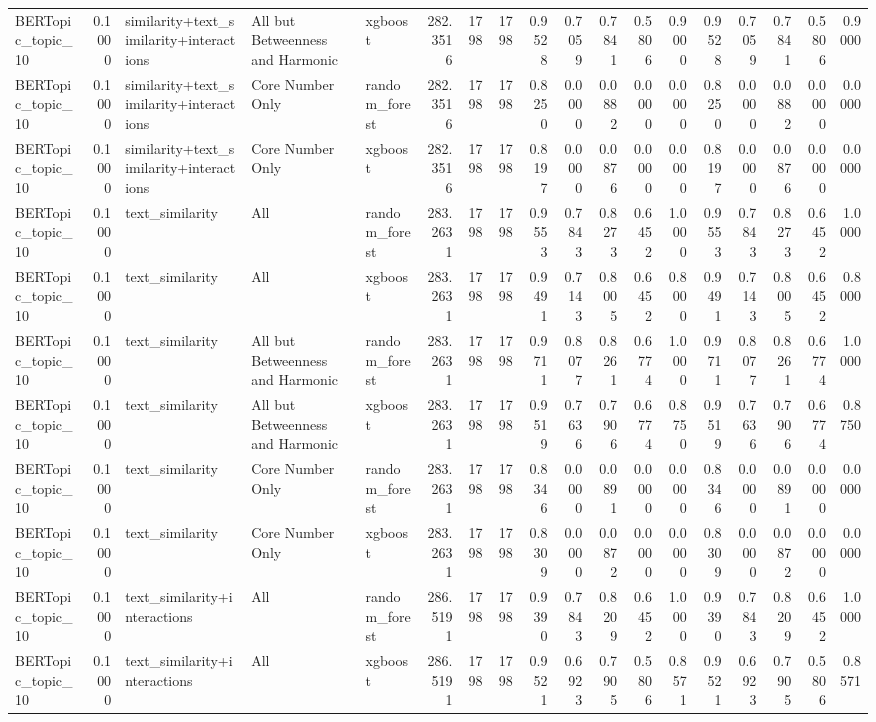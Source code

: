 \begin{tabular}{lrlllrrrrrrrrrrrrr}
BERTopic_topic_10 & 0.1000 & similarity+text_similarity+interactions & All but Betweenness and Harmonic & xgboost & 282.3516 & 1798 & 1798 & 0.9528 & 0.7059 & 0.7841 & 0.5806 & 0.9000 & 0.9528 & 0.7059 & 0.7841 & 0.5806 & 0.9000 \\
BERTopic_topic_10 & 0.1000 & similarity+text_similarity+interactions & Core Number Only & random_forest & 282.3516 & 1798 & 1798 & 0.8250 & 0.0000 & 0.0882 & 0.0000 & 0.0000 & 0.8250 & 0.0000 & 0.0882 & 0.0000 & 0.0000 \\
BERTopic_topic_10 & 0.1000 & similarity+text_similarity+interactions & Core Number Only & xgboost & 282.3516 & 1798 & 1798 & 0.8197 & 0.0000 & 0.0876 & 0.0000 & 0.0000 & 0.8197 & 0.0000 & 0.0876 & 0.0000 & 0.0000 \\
BERTopic_topic_10 & 0.1000 & text_similarity & All & random_forest & 283.2631 & 1798 & 1798 & 0.9553 & 0.7843 & 0.8273 & 0.6452 & 1.0000 & 0.9553 & 0.7843 & 0.8273 & 0.6452 & 1.0000 \\
BERTopic_topic_10 & 0.1000 & text_similarity & All & xgboost & 283.2631 & 1798 & 1798 & 0.9491 & 0.7143 & 0.8005 & 0.6452 & 0.8000 & 0.9491 & 0.7143 & 0.8005 & 0.6452 & 0.8000 \\
BERTopic_topic_10 & 0.1000 & text_similarity & All but Betweenness and Harmonic & random_forest & 283.2631 & 1798 & 1798 & 0.9711 & 0.8077 & 0.8261 & 0.6774 & 1.0000 & 0.9711 & 0.8077 & 0.8261 & 0.6774 & 1.0000 \\
BERTopic_topic_10 & 0.1000 & text_similarity & All but Betweenness and Harmonic & xgboost & 283.2631 & 1798 & 1798 & 0.9519 & 0.7636 & 0.7906 & 0.6774 & 0.8750 & 0.9519 & 0.7636 & 0.7906 & 0.6774 & 0.8750 \\
BERTopic_topic_10 & 0.1000 & text_similarity & Core Number Only & random_forest & 283.2631 & 1798 & 1798 & 0.8346 & 0.0000 & 0.0891 & 0.0000 & 0.0000 & 0.8346 & 0.0000 & 0.0891 & 0.0000 & 0.0000 \\
BERTopic_topic_10 & 0.1000 & text_similarity & Core Number Only & xgboost & 283.2631 & 1798 & 1798 & 0.8309 & 0.0000 & 0.0872 & 0.0000 & 0.0000 & 0.8309 & 0.0000 & 0.0872 & 0.0000 & 0.0000 \\
BERTopic_topic_10 & 0.1000 & text_similarity+interactions & All & random_forest & 286.5191 & 1798 & 1798 & 0.9390 & 0.7843 & 0.8209 & 0.6452 & 1.0000 & 0.9390 & 0.7843 & 0.8209 & 0.6452 & 1.0000 \\
BERTopic_topic_10 & 0.1000 & text_similarity+interactions & All & xgboost & 286.5191 & 1798 & 1798 & 0.9521 & 0.6923 & 0.7905 & 0.5806 & 0.8571 & 0.9521 & 0.6923 & 0.7905 & 0.5806 & 0.8571 \\

\end{tabular}

